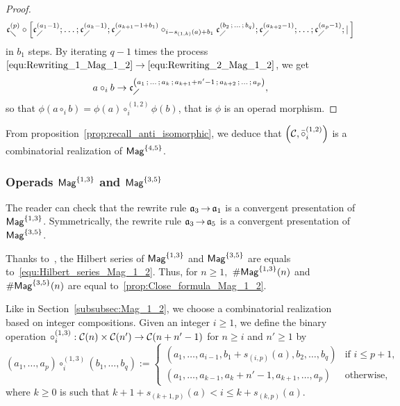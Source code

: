 \begin{proof}
\begin{equation}
\mathfrak{c}^{\left(p\right)}_{\diagdown} \circ \left[\mathfrak{c}^{\left(a_1-1\right)}_{\diagup}; \dots ; \mathfrak{c}^{\left(a_k-1\right)}_{\diagup};
\mathfrak{c}^{\left(a_{k+1}-1+b_1\right)}_{\diagup} \circ_{i-s_{(1,k)}(a)+b_1}
\mathfrak{c}^{\left(b_2 \, ; \, \dots \, ; \, b_q\right)}_{\diagup}  ; \mathfrak{c}^{\left(a_{k+2}-1\right)}_{\diagup} ; \dots;
\mathfrak{c}^{\left(a_p-1\right)}_{\diagup} ; | \, \right]
\end{equation}
 in $b_1$ steps. By iterating $q-1$ times the process
$\eqref{equ:Rewriting_1_Mag_1_2} \rightarrow
\eqref{equ:Rewriting_2_Mag_1_2}$, we get
\begin{equation}
a \circ_i b \rightarrow \mathfrak{c}^{\left(a_1 \, ; \, \dots \, ; \, a_{k} \, ; \,
a_{k+1} + n'-1 \, ; \, a_{k+2} \, ; \, \dots \, ; \, a_p\right)}_{\diagup},
\end{equation}
so that $\phi(a \circ_i b) = \phi(a) \circ_i^{(1,2)} \phi(b)$, that is
$\phi$ is an operad morphism.
\end{proof}
\medbreak

From proposition~\ref{prop:recall_anti_isomorphic}, we deduce that
$\left(\mathcal{C}, \bar{\circ}_i^{(1,2)}\right)$ is a combinatorial
realization of $\mathsf{Mag}^{\{4, 5\}}$.
\medbreak

\subsubsection{Operads $\mathsf{Mag}^{\{1, 3\}}$ and $\mathsf{Mag}^{\{3, 5\}}$}
The reader can check that the rewrite rule $\mathfrak{a}_3 \operatorname{\to} \mathfrak{a}_1$ is a
convergent presentation of $\mathsf{Mag}^{\{1, 3\}}$. Symmetrically, the rewrite
rule $\mathfrak{a}_3 \operatorname{\to} \mathfrak{a}_5$ is a convergent presentation of
$\mathsf{Mag}^{\{3, 5\}}$.
\medbreak

Thanks to~\cite{Gir18}, the Hilbert series of $\mathsf{Mag}^{\{1, 3\}}$ and
$\mathsf{Mag}^{\{3, 5\}}$ are equals to~\eqref{equ:Hilbert_series_Mag_1_2}. Thus,
for $n \geq 1,$ $\# \mathsf{Mag}^{\{1, 3\}}(n)$ and $\# \mathsf{Mag}^{\{3, 5\}}(n)$ are
equal to~\eqref{prop:Close_formula_Mag_1_2}.
\medbreak

Like in Section~\ref{subsubsec:Mag_1_2}, we choose a combinatorial
 realization based on
integer compositions. Given an integer $i \geq 1$, we define the
binary operation
$\circ_i^{(1,3)} : \mathcal{C}(n) \times \mathcal{C}(n')\rightarrow
\mathcal{C}(n + n' -1)$ for
$n \geq i$ and $n' \geq 1$ by
\begin{equation}
    \left(a_1, \dots, a_p\right) \circ_i^{(1,3)}
    \left(b_1, \dots, b_{q}\right)
    :=
    \begin{cases}
        \left(a_1, \dots ,a_{i-1}, b_1 + s_{(i,p)}(a),
        b_2,\dots,b_{q}\right) &
        \mbox{if } i \leq p + 1, \\
        \left(a_1, \dots, a_{k-1}, a_{k} + n'-1, a_{k+1},
        \dots,a_{p}\right)
            & \mbox{otherwise},
    \end{cases}
\end{equation}
where $k \geq 0$ is such that
$k+1 + s_{(k+1,p)}(a) < i \leq k + s_{(k,p)}(a)$.
\medbreak

